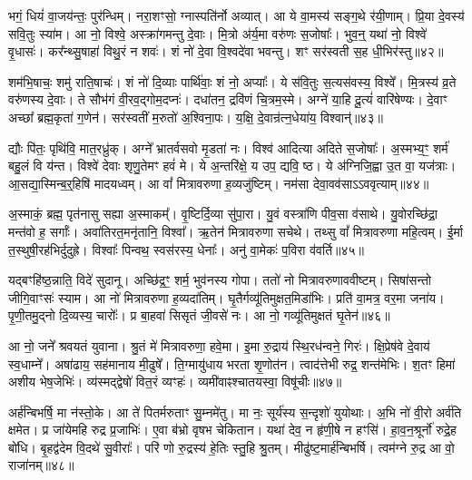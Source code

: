 भगं॒ धियं॑ वा॒जय॑न्तः॒ पुर॑न्धिम्।
नरा॒शꣳसो॒ ग्नास्पति॑र्नो अव्यात्।
आ ये वा॒मस्य॑ सङ्ग॒थे र॑यी॒णाम्।
प्रि॒या दे॒वस्य॑ सवि॒तुः स्या॑म।
आ नो॒ विश्वे॒ अस्क्रा॑गमन्तु दे॒वाः।
मि॒त्रो अ॑र्य॒मा वरु॑णः स॒जोषाः᳚।
भुव॒न्॒ यथा॑ नो॒ विश्वे॑ वृ॒धासः॑।
कर᳚न्थ्सु॒षाहा॑ विथु॒रं न शवः॑।
शं नो॑ दे॒वा वि॒श्वदे॑वा भवन्तु।
शꣳ सर॑स्वती स॒ह धी॒भिर॑स्तु॥४२॥

शम॑भि॒षाचः॒ शमु॑ राति॒षाचः॑।
शं नो॑ दि॒व्याः पार्थि॑वाः॒ शं नो॒ अप्याः᳚।
ये स॑वि॒तुः स॒त्यस॑वस्य॒ विश्वे᳚।
मि॒त्रस्य॑ व्र॒ते वरु॑णस्य दे॒वाः।
ते सौभ॑गं वी॒रव॒द्गोम॒दप्नः॑।
दधा॑तन॒ द्रवि॑णं चि॒त्रम॒स्मे।
अग्ने॑ या॒हि दू॒त्यं॑ वारि॑षेण्यः।
दे॒वाꣳ अच्छा᳚ ब्रह्म॒कृता॑ ग॒णेन॑।
सर॑स्वतीं म॒रुतो॑ अ॒श्विना॒पः।
य॒क्षि॒ दे॒वान्र॑त्न॒धेया॑य॒ विश्वान्॑॥४३॥

द्यौः पि॑तः॒ पृथि॑वि॒ मात॒रध्रु॑क्।
अग्ने᳚ भ्रातर्वसवो मृ॒डता॑ नः।
विश्व॑ आदित्या अदिते स॒जोषाः᳚।
अ॒स्मभ्य॒ꣳ॒ शर्म॑ बहु॒लं वि य॑न्त।
विश्वे॑ देवाः शृणु॒तेमꣳ हवं॑ मे।
ये अ॒न्तरि॑क्षे॒ य उप॒ द्यवि॒ ष्ठ।
ये अ॑ग्निजि॒ह्वा उ॒त वा॒ यज॑त्राः।
आ॒सद्या॒स्मिन्ब॒र्॒हिषि॑ मादयध्वम्।
आ वां᳚ मित्रावरुणा ह॒व्यजु॑ष्टिम्।
नम॑सा देवा॒वव॑साऽऽववृत्याम्॥४४॥

अ॒स्माकं॒ ब्रह्म॒ पृत॑नासु सह्या अ॒स्माकम्᳚।
वृ॒ष्टिर्दि॒व्या सु॑पा॒रा।
यु॒वं वस्त्रा॑णि पीव॒सा व॑साथे।
यु॒वोरच्छि॑द्रा॒ मन्त॑वो ह॒ सर्गाः᳚।
अवा॑तिरत॒मनृ॑तानि॒ विश्वा᳚।
ऋ॒तेन॑ मित्रावरुणा सचेथे।
तथ्सु वां᳚ मित्रावरुणा महि॒त्वम्।
ई॒र्मा त॒स्थुषी॒रह॑भिर्दुदुह्रे।
विश्वाः᳚ पिन्वथ॒ स्वस॑रस्य॒ धेनाः᳚।
अनु॑ वा॒मेकः॑ प॒विरा व॑वर्ति॥४५॥

यद्बꣳहि॑ष्ठ॒न्नाति॒ विदे॑ सुदानू।
अच्छि॑द्र॒ꣳ॒ शर्म॒ भुव॑नस्य गोपा।
ततो॑ नो मित्रावरुणाववीष्टम्।
सिषा॑सन्तो जीगि॒वाꣳसः॑ स्याम।
आ नो॑ मित्रावरुणा ह॒व्यदा॑तिम्।
घृ॒तैर्गव्यू॑तिमुक्षत॒मिडा॑भिः।
प्रति॑ वा॒मत्र॒ वर॒मा जना॑य।
पृ॒णी॒तमु॒द्नो दि॒व्यस्य॒ चारोः᳚।
प्र बा॒हवा॑ सिसृतं जी॒वसे॑ नः।
आ नो॒ गव्यू॑तिमुक्षतं घृ॒तेन॑॥४६॥

आ नो॒ जने᳚ श्रवयतं युवाना।
श्रु॒तं मे॑ मित्रावरुणा॒ हवे॒मा।
इ॒मा रु॒द्राय॑ स्थि॒रध॑न्वने॒ गिरः॑।
क्षि॒प्रेष॑वे दे॒वाय॑ स्व॒धाम्ने᳚।
अषा॑ढाय॒ सह॑मानाय मी॒ढुषे᳚।
ति॒ग्मायु॑धाय भरता शृ॒णोत॑न।
त्वाद॑त्तेभी रुद्र॒ शन्त॑मेभिः।
श॒तꣳ हिमा॑ अशीय भेष॒जेभिः॑।
व्य॑स्मद्द्वेषो॑ वित॒रं व्यꣳहः॑।
व्यमी॑वाꣴश्चातयस्वा॒ विषू॑चीः॥४७॥

अर्\mbox{}ह॑न्बिभर्\mbox{}षि॒ मा न॑स्तो॒के।
आ ते॑ पितर्मरुताꣳ सु॒म्नमे॑तु।
मा नः॒ सूर्य॑स्य स॒न्दृशो॑ युयोथाः।
अ॒भि नो॑ वी॒रो अर्व॑ति क्षमेत।
प्र जा॑येमहि रुद्र प्र॒जाभिः॑।
ए॒वा ब॑भ्रो वृषभ चेकितान।
यथा॑ देव॒ न हृ॑णी॒षे न हꣳसि॑।
हा॒व॒न॒श्रूर्नो॑ रुद्रे॒ह बो॑धि।
बृ॒हद्व॑देम वि॒दथे॑ सु॒वीराः᳚।
परि॑ णो रु॒द्रस्य॑ हे॒तिः स्तु॒हि श्रु॒तम्।
मीढु॑ष्ट॒मार्\mbox{}ह॑न्बिभर्\mbox{}षि।
त्वम॑ग्ने रु॒द्र आ वो॒ राजा॑नम्॥४८॥\anuvakamend[वसू॑नि ततानास्तु॒ विश्वान्॑ ववृत्यां ववर्ति घृ॒तेन॒ विषू॑चीः श्रु॒तन्द्वे च॑]

